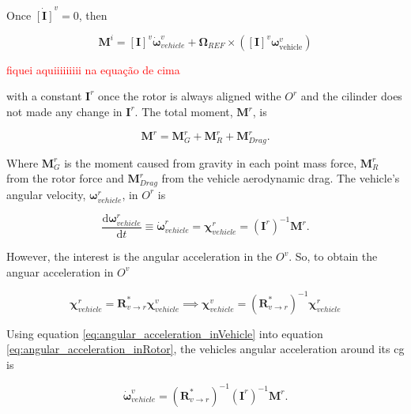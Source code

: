 Once $\dot{\left[\mathbf{I}\right]}^v = 0$, then

\begin{equation}
    \mathbf{M}^i =\left[\mathbf{I}\right]^v \dot{\boldsymbol{\omega}}_{vehicle}^v + \boldsymbol{\Omega}_{REF} \times \left(\left[\mathbf{I}\right]^v \boldsymbol{\omega}_{\text{vehicle}}^v\right)
\end{equation}


\textcolor{red}{fiquei aquiiiiiiiii na equação de cima}

with a constant $\mathbf{I}^r$ once the rotor is always aligned withe $O^r$ and the cilinder does not made any change in $\mathbf{I}^r$. The total moment, $\mathbf{M}^r$, is 

\begin{equation}
    \mathbf{M}^r = \mathbf{M}_G^r + \mathbf{M}_R^r + \mathbf{M}_{Drag}^r.
\end{equation}

Where $\mathbf{M}_G^r$ is the moment caused from gravity in each point mass force, $\mathbf{M}_R^r$ from the rotor force and $\mathbf{M}_{Drag}^r$ from the vehicle aerodynamic drag. The vehicle's angular velocity, $\boldsymbol{\omega}^r_{vehicle}$, in $O^r$ is

\begin{equation}
    \frac{\mathrm{d}\boldsymbol{\omega}^r_{vehicle}}{\mathrm{d}t} \equiv \boldsymbol{\dot{\omega}}^r_{vehicle} = \boldsymbol{\chi}^r_{vehicle} = (\mathbf{I}^r)^{-1} \mathbf{M}^r.
    \label{eq:angular_acceleration_inRotor}
\end{equation}

However, the interest is the angular acceleration in the $O^v$. So, to obtain the anguar acceleration in $O^v$

\begin{equation}
    \boldsymbol{\chi}^r_{vehicle} = \boldsymbol{R}^*_{v \rightarrow r} \boldsymbol{\chi}^v_{vehicle} \implies \boldsymbol{\chi}^v_{vehicle} = \left(\boldsymbol{R}^*_{v \rightarrow r}\right)^{-1} \boldsymbol{\chi}^r_{vehicle}
    \label{eq:angular_acceleration_inVehicle}
\end{equation}

Using equation \ref{eq:angular_acceleration_inVehicle} into equation \ref{eq:angular_acceleration_inRotor}, the vehicles angular acceleration around its \gls{cg} is

\begin{equation}
    \boldsymbol{\dot{\omega}}^v_{vehicle} = \left(\boldsymbol{R}^*_{v \rightarrow r}\right)^{-1} (\mathbf{I}^r)^{-1} \mathbf{M}^r.
\end{equation}


